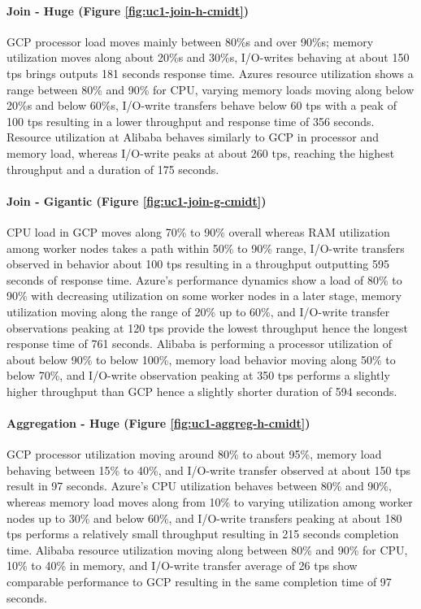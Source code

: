 \documentclass[review]{elsarticle}
\begin{document}
\paragraph{Join - Huge (Figure \ref{fig:uc1-join-h-cmidt})}GCP processor load moves mainly between 80\%s and over 90\%s; memory utilization moves along about 20\%s and 30\%s, I/O-writes behaving at about 150 tps brings outputs 181 seconds response time. Azures resource utilization shows a range between 80\% and 90\% for CPU, varying memory loads moving along below 20\%s and below 60\%s, I/O-write transfers behave below 60 tps with a peak of 100 tps resulting in a lower throughput and response time of 356 seconds. Resource utilization at Alibaba behaves similarly to GCP in processor and memory load, whereas I/O-write peaks at about 260 tps, reaching the highest throughput and a duration of 175 seconds.

\paragraph{Join - Gigantic (Figure \ref{fig:uc1-join-g-cmidt})}CPU load in GCP moves along 70\% to 90\% overall whereas RAM utilization among worker nodes takes a path within 50\% to 90\% range, I/O-write transfers observed in behavior about 100 tps resulting in a throughput outputting 595 seconds of response time. Azure's performance dynamics show a load of 80\% to 90\% with decreasing utilization on some worker nodes in a later stage, memory utilization moving along the range of 20\% up to 60\%, and I/O-write transfer observations peaking at 120 tps provide the lowest throughput hence the longest response time of 761 seconds. Alibaba is performing a processor utilization of about below 90\% to below 100\%, memory load behavior moving along 50\% to below 70\%, and I/O-write observation peaking at 350 tps performs a slightly higher throughput than GCP hence a slightly shorter duration of 594 seconds.

\paragraph{Aggregation - Huge (Figure \ref{fig:uc1-aggreg-h-cmidt})}GCP processor utilization moving around 80\% to about 95\%, memory load behaving between 15\% to 40\%, and I/O-write transfer observed at about 150 tps result in 97 seconds. Azure's CPU utilization behaves between 80\% and 90\%, whereas memory load moves along from 10\% to varying utilization among worker nodes up to 30\% and below 60\%, and I/O-write transfers peaking at about 180 tps performs a relatively small throughput resulting in 215 seconds completion time. Alibaba resource utilization moving along between 80\% and 90\% for CPU, 10\% to 40\% in memory, and I/O-write transfer average of 26 tps show comparable performance to GCP resulting in the same completion time of 97 seconds.
\end{document}
